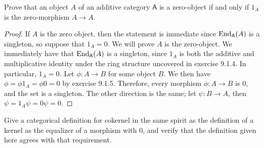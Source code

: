 \documentclass[11pt]{report}
\begin{document}
\begin{exercise}
	Prove that an object $A$ of an additive category $\mathsf{A} $ is a zero-object if and only if $1_A$ is the zero-morphism $A\to A$.
\end{exercise}
\begin{proof}
	If $A$ is the zero object, then the statement is immediate since $\operatorname{End}_{\mathsf{A} }(A) $ is a singleton, so suppose that $1_A=0$. We will prove $A$ is the zero-object. We immediately have that $\operatorname{End}_{\mathsf{A} }(A) $ is a singleton, since $1_A$ is both the additive and multiplicative identity under the ring structure uncovered in exercise 9.1.4. In particular, $1_A=0$. Let $\phi : A \to B$ for some object $B$. We then have $\phi =\phi 1_A=\phi 0=0$ by exercise 9.1.5. Therefore, every morphism $\phi : A \to B$ is $0$, and the set is a singleton. The other direction is the same; let $\psi : B \to A$, then $\psi =1_A \psi =0\psi =0$.
\end{proof}
\begin{exercise}
	Give a categorical definition for cokernel in the same spirit as the definition of a kernel as the equalizer of a morphism with $0$, and verify that the definition given here agrees with that requirement.
\end{exercise}
\end{document}
